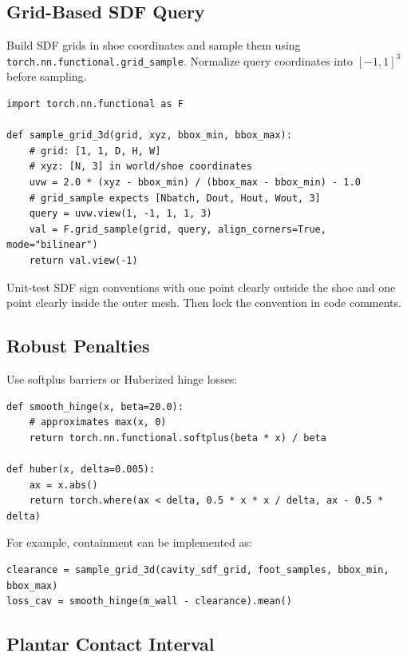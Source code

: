 \documentclass[11pt]{article}
\begin{document}
\subsection{Grid-Based SDF Query}

Build SDF grids in shoe coordinates and sample them using \texttt{torch.nn.functional.grid\_sample}. Normalize query coordinates into $[-1,1]^3$ before sampling.

\begin{lstlisting}[style=pythonstyle]
import torch.nn.functional as F

def sample_grid_3d(grid, xyz, bbox_min, bbox_max):
    # grid: [1, 1, D, H, W]
    # xyz: [N, 3] in world/shoe coordinates
    uvw = 2.0 * (xyz - bbox_min) / (bbox_max - bbox_min) - 1.0
    # grid_sample expects [Nbatch, Dout, Hout, Wout, 3]
    query = uvw.view(1, -1, 1, 1, 3)
    val = F.grid_sample(grid, query, align_corners=True, mode="bilinear")
    return val.view(-1)
\end{lstlisting}

Unit-test SDF sign conventions with one point clearly outside the shoe and one point clearly inside the outer mesh. Then lock the convention in code comments.

\subsection{Robust Penalties}

Use softplus barriers or Huberized hinge losses:

\begin{lstlisting}[style=pythonstyle]
def smooth_hinge(x, beta=20.0):
    # approximates max(x, 0)
    return torch.nn.functional.softplus(beta * x) / beta

def huber(x, delta=0.005):
    ax = x.abs()
    return torch.where(ax < delta, 0.5 * x * x / delta, ax - 0.5 * delta)
\end{lstlisting}

For example, containment can be implemented as:

\begin{lstlisting}[style=pythonstyle]
clearance = sample_grid_3d(cavity_sdf_grid, foot_samples, bbox_min, bbox_max)
loss_cav = smooth_hinge(m_wall - clearance).mean()
\end{lstlisting}

\subsection{Plantar Contact Interval}
\end{document}
